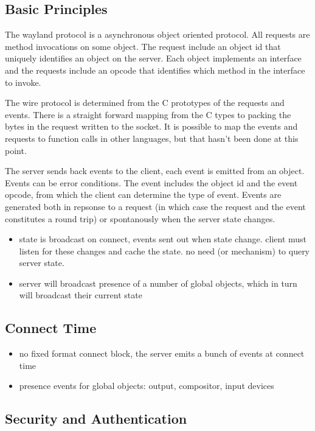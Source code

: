 \documentclass{article}
\begin{document}
\subsection{Basic Principles}

The wayland protocol is a asynchronous object oriented protocol.  All
requests are method invocations on some object.  The request include
an object id that uniquely identifies an object on the server.  Each
object implements an interface and the requests include an opcode that
identifies which method in the interface to invoke.

The wire protocol is determined from the C prototypes of the requests
and events.  There is a straight forward mapping from the C types to
packing the bytes in the request written to the socket.  It is
possible to map the events and requests to function calls in other
languages, but that hasn't been done at this point.

The server sends back events to the client, each event is emitted from
an object.  Events can be error conditions.  The event includes the
object id and the event opcode, from which the client can determine
the type of event.  Events are generated both in repsonse to a request
(in which case the request and the event constitutes a round trip) or
spontanously when the server state changes.

\begin{itemize}
\item state is broadcast on connect, events sent out when state
  change.  client must listen for these changes and cache the state.
  no need (or mechanism) to query server state.

\item server will broadcast presence of a number of global objects,
  which in turn will broadcast their current state
\end{itemize}

\subsection{Connect Time}

\begin{itemize}
\item no fixed format connect block, the server emits a bunch of
  events at connect time
\item presence events for global objects: output, compositor, input
  devices
\end{itemize}
\subsection{Security and Authentication}
\end{document}
